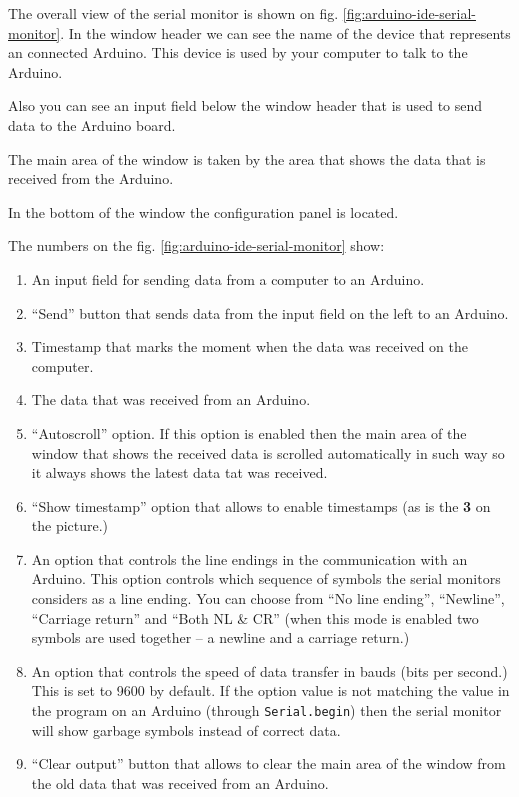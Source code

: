 \documentclass[../sparc.tex]{subfiles}
\begin{document}
The overall view of the serial monitor is shown on fig.
\ref{fig:arduino-ide-serial-monitor}.  In the window header we can see the name
of the device that represents an connected Arduino.  This device is used by your
computer to talk to the Arduino.

Also you can see an input field below the window header that is used to send
data to the Arduino board.

The main area of the window is taken by the area that shows the data that is
received from the Arduino.

In the bottom of the window the configuration panel is located.

The numbers on the fig. \ref{fig:arduino-ide-serial-monitor} show:
\begin{enumerate}
\item An input field for sending data from a computer to an Arduino.
\item ``Send'' button that sends data from the input field on the left to an
  Arduino.
\item Timestamp that marks the moment when the data was received on the
  computer.
\item The data that was received from an Arduino.
\item ``Autoscroll'' option.  If this option is enabled then the main area of
  the window that shows the received data is scrolled automatically in such way
  so it always shows the latest data tat was received.
\item ``Show timestamp'' option that allows to enable timestamps (as is the
  \textbf{3} on the picture.)
\item An option that controls the line endings in the communication with an
  Arduino.  This option controls which sequence of symbols the serial monitors
  considers as a line ending.  You can choose from ``No line ending'',
  ``Newline'', ``Carriage return'' and ``Both NL \& CR'' (when this mode is
  enabled two symbols are used together -- a newline and a carriage return.)
\item An option that controls the speed of data transfer in bauds (bits per
  second.)  This is set to 9600 by default.  If the option value is not matching
  the value in the program on an Arduino (through \texttt{Serial.begin}) then
  the serial monitor will show garbage symbols instead of correct data.
\item ``Clear output'' button that allows to clear the main area of the window
  from the old data that was received from an Arduino.
\end{enumerate}
\end{document}
